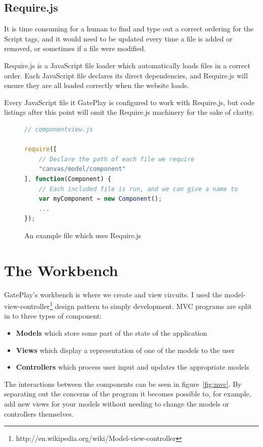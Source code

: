 \subsection{Require.js}
It is time consuming for a human to find and type out a correct ordering for the Script tags, and it would need to be updated every time a file is added or removed, or sometimes if a file were modified.

Require.js is a JavaScript file loader which automatically loads files in a correct order. Each JavaScript file declares its direct dependencies, and Require.js will ensure they are all loaded correctly when the website loads.

Every JavaScript file it GatePlay is configured to work with Require.js, but code listings after this point will omit the Require.js machinery for the sake of clarity.

\begin{figure}[H]
\begin{lstlisting}[language=JavaScript]
// componentview.js

require([
	// Declare the path of each file we require	
	"canvas/model/component"
], function(Component) {
	// Each included file is run, and we can give a name to whatever it returns if desired
	var myComponent = new Component();
	...
});
\end{lstlisting}
\caption{An example file which uses Require.js}
\end{figure}

\section{The Workbench}
\label{section:workbench}
GatePlay's workbench is where we create and view circuits. I used the model-view-controller\footnote{http://en.wikipedia.org/wiki/Model-view-controller} design pattern to simply development. MVC programs are split in to three types of component:

\begin{itemize}
	\item \textbf{Models} which store some part of the state of the application
	\item \textbf{Views} which display a representation of one of the models to the user
	\item \textbf{Controllers} which process user input and updates the appropriate models
\end{itemize}

The interactions between the components can be seen in figure~\ref{fig:mvc}. By separating out the concerns of the program it becomes possible to, for example, add new views for your models without needing to change the models or controllers themselves.

